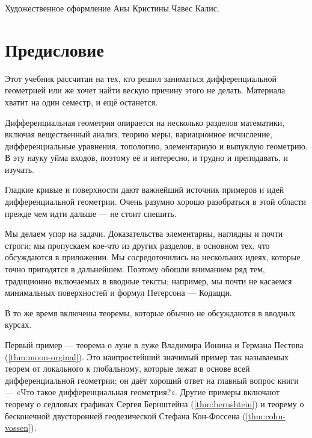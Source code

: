 Художественное оформление Аны Кристины Чавес Калис.
\null
\vfill
{}


\thispagestyle{empty}
\newpage

\chapter*{Предисловие}
\thispagestyle{myheadings}

Этот учебник рассчитан на тех, кто решил заниматься дифференциальной геометрией или же хочет найти вескую причину этого не делать.
Материала хватит на один семестр, и ещё останется.

Дифференциальная геометрия опирается на несколько разделов математики, включая
вещественный анализ,
теорию меры,
вариационное исчисление,
дифференциальные уравнения, топологию, элементарную и выпуклую геометрию.
В эту науку уйма входов, поэтому её и интересно, и трудно и преподавать, и изучать.

Гладкие кривые и поверхности дают важнейший источник примеров и идей дифференциальной геометрии.
Очень разумно хорошо разобраться в этой области прежде чем идти дальше --- не стоит спешить.

Мы делаем упор на задачи.
Доказательства элементарны, наглядны и почти строги;
мы пропускаем кое-что из других разделов, в основном тех, что обсуждаются в приложении.
Мы сосредоточились на нескольких идеях, которые точно пригодятся в дальнейшем.
Поэтому обошли вниманием ряд тем, традиционно включаемых в вводные тексты;
например, мы почти не касаемся минимальных поверхностей и формул Петерсона --- Кодацци.

В то же время включены теоремы, которые обычно не обсуждаются в вводных курсах.

Первый пример --- теорема о луне в луже Владимира Ионина и Германа Пестова (\ref{thm:moon-orginal}).
Это наипростейший значимый пример так называемых теорем от локального к глобальному, которые лежат в основе всей дифференциальной геометрии;
он даёт хороший ответ на главный вопрос книги --- «Что такое дифференциальная геометрия?».
Другие примеры включают теорему о седловых графиках Сергея Бернштейна (\ref{thm:bernshtein}) и теорему о бесконечной двусторонней геодезической Стефана Кон-Фоссена (\ref{thm:cohn-vossen}).

